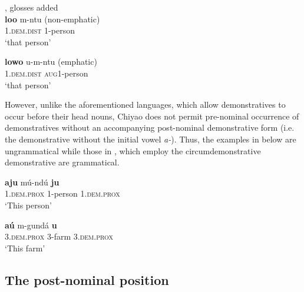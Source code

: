 \documentclass[output=paper,
            colorlinks, citecolor=brown
            ,draftmode
		  ]{langscibook}
\begin{document}
 \ea\label{ex:taji:20} \citet[14]{VandeVelde2005}, glosses added\\
    \ea\label{ex:taji:20a} \gll \textbf{loo}                        m-ntu      (non-emphatic)\\
      1.\textsc{dem.dist}    1-person\\
    \glt ‘that person’

    \ex\label{ex:taji:20b} \gll \textbf{lowo}                          u-m-ntu     (emphatic)\\
      1.\textsc{dem.dist}    \textsc{aug}1-person        \\
      \glt ‘that person’
    \z
\z

However, unlike the aforementioned languages, which allow demonstratives to occur before their head nouns, Chiyao does not permit pre-nominal occurrence of demonstratives without an accompanying post-nominal demonstrative form (i.e. the demonstrative without the initial vowel \textit{a-}). Thus, the examples in  below are ungrammatical while those in , which employ the circumdemonstrative demonstrative are grammatical.

\ea%
    \begin{multicols}{2}
    \label{ex:taji:20bis}
    \label{ex:taji:20bisa}

    \label{ex:taji:20bisb}
    \z
    \end{multicols}

\ex%
    \label{ex:taji:21}
    \ea\label{ex:taji:21a} \gll \textbf{aju}                        mú{}-ndú      \textbf{ju}\\
      1.\textsc{dem.prox}    1-person    1.\textsc{dem.prox}\\
    \glt ‘This person’

    \ex\label{ex:taji:21b} \gll \textbf{aú}                          m-gundá    \textbf{u}\\
      3.\textsc{dem.prox}    3-farm        3.\textsc{dem.prox}\\
      \glt ‘This farm’
    \z
\z

\subsection{The post-nominal position}\label{sec:taji:5.2}
\end{document}
